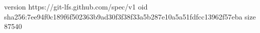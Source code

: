 version https://git-lfs.github.com/spec/v1
oid sha256:7ee94f0c189f6f502363b9ad30f3f38f33a5b287e10a5a51fdfcc13962f57eba
size 87540
